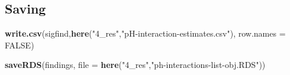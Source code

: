 \documentclass[
]{article}
\newenvironment{Shaded}{\begin{snugshade}}{\end{snugshade}}
\newcommand{\AttributeTok}[1]{\textcolor[rgb]{0.13,0.29,0.53}{#1}}
\newcommand{\ConstantTok}[1]{\textcolor[rgb]{0.56,0.35,0.01}{#1}}
\newcommand{\FunctionTok}[1]{\textcolor[rgb]{0.13,0.29,0.53}{\textbf{#1}}}
\newcommand{\NormalTok}[1]{#1}
\newcommand{\StringTok}[1]{\textcolor[rgb]{0.31,0.60,0.02}{#1}}
\begin{document}
\hypertarget{saving}{%
\subsection{Saving}\label{saving}}

\begin{Shaded}
\begin{Highlighting}[]
\FunctionTok{write.csv}\NormalTok{(sigfind,}\FunctionTok{here}\NormalTok{(}\StringTok{"4\_res"}\NormalTok{,}\StringTok{"pH{-}interaction{-}estimates.csv"}\NormalTok{), }\AttributeTok{row.names =} \ConstantTok{FALSE}\NormalTok{)}

\FunctionTok{saveRDS}\NormalTok{(findings, }\AttributeTok{file =} \FunctionTok{here}\NormalTok{(}\StringTok{"4\_res"}\NormalTok{,}\StringTok{"ph{-}interactions{-}list{-}obj.RDS"}\NormalTok{))}
\end{Highlighting}
\end{Shaded}
\end{document}
